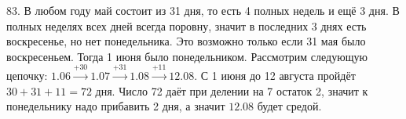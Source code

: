 83. В любом году май состоит из 31 дня, то есть 4 полных недель и ещё 3 дня. В полных неделях всех дней всегда поровну, значит в последних 3 днях есть воскресенье, но нет понедельника. Это возможно только если 31 мая было воскресеньем. Тогда 1 июня было понедельником. Рассмотрим следующую цепочку:
$1.06\stackrel{+30}{\rightarrow}1.07\stackrel{+31}{\rightarrow}1.08\stackrel{+11}{\rightarrow}12.08.$ С 1 июня до 12 августа пройдёт $30+31+11=72$ дня. Число 72 даёт при делении на 7 остаток 2, значит к понедельнику надо прибавить 2 дня, а значит $12.08$ будет средой.\\
